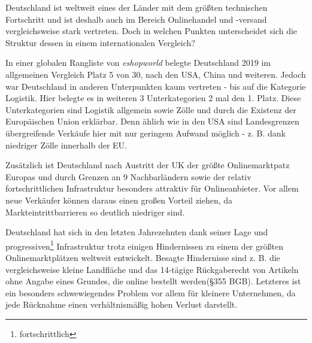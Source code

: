 \iffalse

deu: 14-tage rückgabe durch §355 BGB

https://www.worldretailcongress.com/__media/Global_ecommerce_Market_Ranking_2019_001.pdf
\cite{esworld} 

--> 
    63.9mio online shoppers, D ist ein land in dem es den onlinehandel schon lange gibt
    
<--


einleitung: schlüsse aus ländern, die onlinehandel stärker nutzen, ziehen; jedoch ist D. schon vorreiter also wenig info
\fi


Deutschland ist weltweit eines der Länder mit dem größten technischen Fortschritt und ist deshalb auch im Bereich Onlinehandel und -versand vergleichsweise stark vertreten. Doch in welchen Punkten unterscheidet sich die Struktur dessen in einem internationalen Vergleich?

In einer globalen Rangliste von \emph{eshopworld} belegte Deutschland 2019 im allgemeinen Vergleich Platz 5 von 30, nach den USA, China und weiteren\cite[S. 3]{esworld}. Jedoch war Deutschland in anderen Unterpunkten kaum vertreten - bis auf die Kategorie Logistik. Hier belegte es in weiteren 3 Unterkategorien 2 mal den 1. Platz\cite[S. 10ff]{esworld}. Diese Unterkategorien sind Logistik allgemein sowie Zölle und durch die Existenz der Europäischen Union erklärbar. Denn ählich wie in den USA\cite[S. 4]{esworld} sind Landesgrenzen übergreifende Verkäufe hier mit nur geringem Aufwand möglich - z. B. dank niedriger Zölle innerhalb der EU.%

Zusätzlich ist Deutschland nach Austritt der UK der größte Onlinemarktpatz Europas und durch Grenzen an 9 Nachbarländern sowie der relativ fortschrittlichen Infrastruktur besonders attraktiv für Onlineanbieter. Vor allem neue Verkäufer können daraus einen großen Vorteil ziehen, da Markteintrittbarrieren so deutlich niedriger sind\cite[S. 8]{esworld}.

Deutschland hat sich in den letzten Jahrezehnten dank seiner Lage und progressiven\footnote{fortschrittlich} Infrastruktur trotz einigen Hindernissen zu einem der größten Onlinemarktplätzen weltweit entwickelt. Besagte Hindernisse sind z. B. die vergleichsweise kleine Landfläche und das 14-tägige Rückgaberecht von Artikeln ohne Angabe eines Grundes, die online bestellt werden(§355 BGB). Letzteres ist ein besonders schwewiegendes Problem vor allem für kleinere Unternehmen, da jede Rücknahme einen verhältnismäßig hohen Verlust darstellt\cite{retourwahnsinn}.

